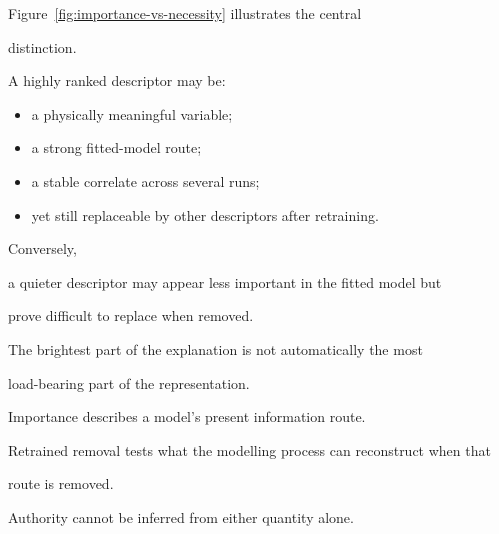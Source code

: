 \documentclass[11pt,a4paper,oneside]{report}
\begin{document}
Figure~\ref{fig:importance-vs-necessity} illustrates the central

distinction.



A highly ranked descriptor may be:



\begin{itemize}



\item

a physically meaningful variable;



\item

a strong fitted-model route;



\item

a stable correlate across several runs;



\item

yet still replaceable by other descriptors after retraining.



\end{itemize}



Conversely,

a quieter descriptor may appear less important in the fitted model but

prove difficult to replace when removed.



The brightest part of the explanation is not automatically the most

load-bearing part of the representation.





\begin{governingrule}



Importance describes a model's present information route.



Retrained removal tests what the modelling process can reconstruct when that

route is removed.



Authority cannot be inferred from either quantity alone.



\end{governingrule}
\end{document}
